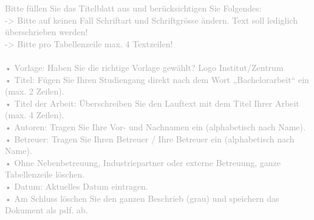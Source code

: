 \begin{titlepage}
\textcolor{darkgray}{
Bitte füllen Sie das Titelblatt aus und berücksichtigen Sie Folgendes:\\
 -> Bitte auf keinen Fall Schriftart und Schriftgrösse ändern. Text soll lediglich überschrieben werden!\\
 -> Bitte pro Tabellenzeile max. 4 Textzeilen!\\
\\
•	Vorlage: Haben Sie die richtige Vorlage gewählt? Logo Institut/Zentrum\\
•	Titel: Fügen Sie Ihren Studiengang direkt nach dem Wort „Bachelorarbeit“ ein (max. 2 Zeilen).\\
•	Titel der Arbeit: Überschreiben Sie den Lauftext mit dem Titel Ihrer Arbeit (max. 4 Zeilen).\\
•	Autoren: Tragen Sie Ihre Vor- und Nachnamen ein (alphabetisch nach Name).\\
•	Betreuer: Tragen Sie Ihren Betreuer / Ihre Betreuer ein (alphabetisch nach Name).\\
•	Ohne Nebenbetreuung, Industriepartner oder externe Betreuung, ganze Tabellenzeile löschen.\\
•	Datum: Aktuelles Datum eintragen.\\
•	Am Schluss löschen Sie den ganzen Beschrieb (grau) und speichern das Dokument als pdf. ab.
}

\end{titlepage}

